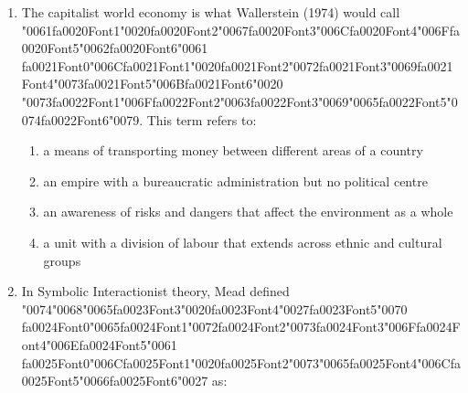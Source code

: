 \documentclass[12pt]{article}
\begin{document}
\begin{enumerate}[label=\arabic*.]
\begin{enumerate}[label=(\alph*)]
    \item relative poverty
    \item vertical mobility
    \item horizontal mobility
\end{enumerate}
\item The capitalist world economy is what Wallerstein (1974) would call {\char"0061}{\csname fa0020Font1\endcsname\char"0020}{\csname fa0020Font2\endcsname\char"0067}{\csname fa0020Font3\endcsname\char"006C}{\csname fa0020Font4\endcsname\char"006F}{\csname fa0020Font5\endcsname\char"0062}{\csname fa0020Font6\endcsname\char"0061} {\csname fa0021Font0\endcsname\char"006C}{\csname fa0021Font1\endcsname\char"0020}{\csname fa0021Font2\endcsname\char"0072}{\csname fa0021Font3\endcsname\char"0069}{\csname fa0021Font4\endcsname\char"0073}{\csname fa0021Font5\endcsname\char"006B}{\csname fa0021Font6\endcsname\char"0020} {\char"0073}{\csname fa0022Font1\endcsname\char"006F}{\csname fa0022Font2\endcsname\char"0063}{\csname fa0022Font3\endcsname\char"0069}{\char"0065}{\csname fa0022Font5\endcsname\char"0074}{\csname fa0022Font6\endcsname\char"0079}. This term refers to:
\begin{enumerate}[label=(\alph*)]
    \item a means of transporting money between different areas of a country
    \item an empire with a bureaucratic administration but no political centre
    \item an awareness of risks and dangers that affect the environment as a whole
    \item a unit with a division of labour that extends across ethnic and cultural groups
\end{enumerate}
\item In Symbolic Interactionist theory, Mead defined {\char"0074}{\char"0068}{\char"0065}{\csname fa0023Font3\endcsname\char"0020}{\csname fa0023Font4\endcsname\char"0027}{\csname fa0023Font5\endcsname\char"0070} {\csname fa0024Font0\endcsname\char"0065}{\csname fa0024Font1\endcsname\char"0072}{\csname fa0024Font2\endcsname\char"0073}{\csname fa0024Font3\endcsname\char"006F}{\csname fa0024Font4\endcsname\char"006E}{\csname fa0024Font5\endcsname\char"0061} {\csname fa0025Font0\endcsname\char"006C}{\csname fa0025Font1\endcsname\char"0020}{\csname fa0025Font2\endcsname\char"0073}{\char"0065}{\csname fa0025Font4\endcsname\char"006C}{\csname fa0025Font5\endcsname\char"0066}{\csname fa0025Font6\endcsname\char"0027} as:
\begin{enumerate}[label=(\alph*)]

\end{enumerate}
\end{enumerate}
\end{document}
